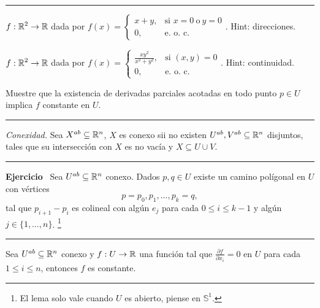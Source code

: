\vspace{0.2in}

  \hrule
  \begin{example}
    \(\displaystyle f : \mathbb{R}^2\rightarrow \mathbb{R}\) dada por \(\displaystyle f(x) = \begin{cases}
      x+y, &\text{si\ }x=0\ \text{o}\ y=0\\
      0, &\text{e. o. c.}
    \end{cases}\). Hint: direcciones. 
  \end{example}
  \begin{example}
    \(\displaystyle f:\mathbb{R}^2\rightarrow \mathbb{R}\) dada por \(\displaystyle f(x) = \begin{cases}
      \frac{xy^2}{x^2+y^2}, &\text{si\ }(x,y)=0\\
      0, &\text{e. o. c.}
    \end{cases}\). Hint: continuidad. 
  \end{example}
  \begin{exercise}
    Muestre que la existencia de derivadas parciales acotadas en todo punto \(p\in U\) implica \(f\) constante en \(U\). 
  \end{exercise}
  \hrule

  \vspace{0.2in}

  \begin{definition} 
    \textit{Conexidad.} Sea \(X^{ab}\subseteq \mathbb{R}^n\), \(X\) es conexo sii no existen \(U^{ab},V^{ab}\subseteq \mathbb{R}^n\) disjuntos, tales que su intersección con \(X\) es no vacía y \(X\subseteq U\cup V\). 
  \end{definition}

\vspace{0.2in}

  \hrule 
  \begin{proposition}
    \textbf{Ejercicio} \ Sea \(U^{ab}\subseteq \mathbb{R}^n\) conexo. Dados \(p,q\in U\) existe un camino polígonal en \(U\) con vértices
    \[p = p_0, p_1, \ldots, p_k = q,\]
    tal que \(p_{i+1}- p_i\) es colineal con algún \(e_j\) para cada \(0\leq i\leq k-1\) y algún \(j \in \{1,\ldots,n\}\). \footnote{El lema solo vale cuando \(U\) es abierto, piense en \(\mathds{S}^1\).\vspace{0.5in}}
  \end{proposition}
  \hrule 

\vspace{0.2in}


  \begin{proposition}
    Sea \(U^{ab}\subseteq \mathbb{R}^n\) conexo y \(f:U\rightarrow \mathbb{R}\) una función tal que \(\frac{\partial f}{\partial x_i} = 0\) en \(U\) para cada \(1\leq i\leq n\), entonces \(f\) es constante.  
  \end{proposition}

  \vspace{0.2in}
